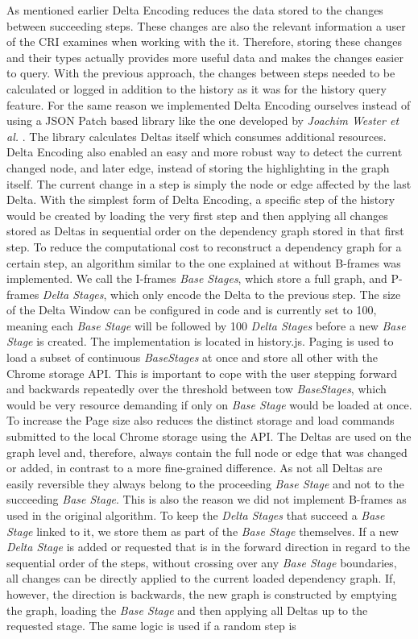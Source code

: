 As mentioned earlier Delta Encoding reduces the data stored to the changes between succeeding steps. These changes are also the relevant information a user of the CRI examines when working with the it. Therefore, storing these changes and their types actually provides more useful data and makes the changes easier to query. With the previous approach, the changes between steps needed to be calculated or logged in addition to the history as it was for the history query feature. For the same reason we implemented Delta Encoding ourselves instead of using a JSON Patch \cite{JSONPatch} based library like the one developed by \emph{Joachim Wester et al.} \cite{JSONPatchImplementation}. The library calculates Deltas itself which consumes additional resources. Delta Encoding also enabled an easy and more robust way to detect the current changed node, and later edge, instead of storing the highlighting in the graph itself. The current change in a step is simply the node or edge affected by the last Delta. With the simplest form of Delta Encoding, a specific step of the history would be created by loading the very first step and then applying all changes stored as Deltas in sequential order on the dependency graph stored in that first step. To reduce the computational cost to reconstruct a dependency graph for a certain step, an algorithm similar to the one explained at \cite{VideoEncoding} without B-frames was implemented. We call the I-frames \emph{Base Stages}, which store a full graph, and P-frames \emph{Delta Stages}, which only encode the Delta to the previous step. The size of the Delta Window can be configured in code and is currently set to 100, meaning each \emph{Base Stage} will be followed by 100 \emph{Delta Stages} before a new \emph{Base Stage} is created. The implementation is located in history.js. Paging is used to load a subset of continuous \emph{BaseStages} at once and store all other with the Chrome storage API. This is important to cope with the user stepping forward and backwards repeatedly over the threshold between tow \emph{BaseStages}, which would be very resource demanding if only on \emph{Base Stage} would be loaded at once. To increase the Page size also reduces the distinct storage and load commands submitted to the local Chrome storage using the API. The Deltas are used on the graph level and, therefore, always contain the full node or edge that was changed or added, in contrast to a more fine-grained difference. As not all Deltas are easily reversible they always belong to the proceeding \emph{Base Stage} and not to the succeeding \emph{Base Stage}. This is also the reason we did not implement B-frames as used in the original algorithm. To keep the \emph{Delta Stages} that succeed a \emph{Base Stage} linked to it, we store them as part of the \emph{Base Stage} themselves. If a new \emph{Delta Stage} is added or requested that is in the forward direction in regard to the sequential order of the steps, without crossing over any \emph{Base Stage} boundaries, all changes can be directly applied to the current loaded dependency graph. If, however, the direction is backwards, the new graph is constructed by emptying the graph, loading the \emph{Base Stage} and then applying all Deltas up to the requested stage. The same logic is used if a random step is 